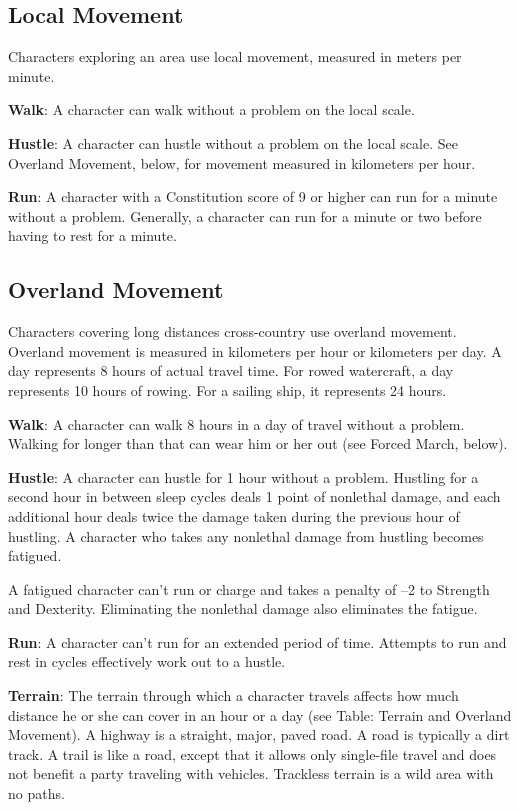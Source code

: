 \subsection{Local Movement}
Characters exploring an area use local movement, measured in meters per minute.

\textbf{Walk}: A character can walk without a problem on the local scale.

\textbf{Hustle}: A character can hustle without a problem on the local scale. See Overland Movement, below, for movement measured in kilometers per hour.

\textbf{Run}: A character with a Constitution score of 9 or higher can run for a minute without a problem. Generally, a character can run for a minute or two before having to rest for a minute.

\subsection{Overland Movement}
Characters covering long distances cross-country use overland movement. Overland movement is measured in kilometers per hour or kilometers per day. A day represents 8 hours of actual travel time. For rowed watercraft, a day represents 10 hours of rowing. For a sailing ship, it represents 24 hours.

\textbf{Walk}: A character can walk 8 hours in a day of travel without a problem. Walking for longer than that can wear him or her out (see Forced March, below).

\textbf{Hustle}: A character can hustle for 1 hour without a problem. Hustling for a second hour in between sleep cycles deals 1 point of nonlethal damage, and each additional hour deals twice the damage taken during the previous hour of hustling. A character who takes any nonlethal damage from hustling becomes fatigued.

A fatigued character can't run or charge and takes a penalty of --2 to Strength and Dexterity. Eliminating the nonlethal damage also eliminates the fatigue.

\textbf{Run}: A character can't run for an extended period of time. Attempts to run and rest in cycles effectively work out to a hustle.

\textbf{Terrain}: The terrain through which a character travels affects how much distance he or she can cover in an hour or a day (see Table: Terrain and Overland Movement). A highway is a straight, major, paved road. A road is typically a dirt track. A trail is like a road, except that it allows only single-file travel and does not benefit a party traveling with vehicles. Trackless terrain is a wild area with no paths.

